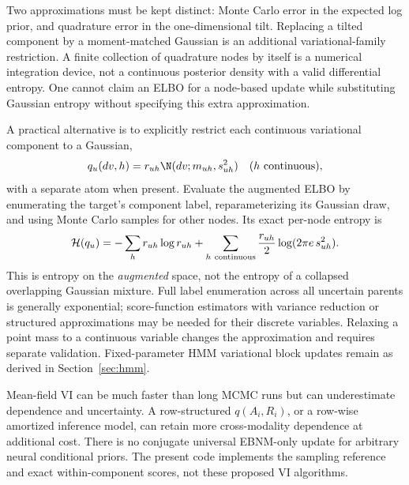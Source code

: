 Two approximations must be kept distinct: Monte Carlo error in the
expected log prior, and quadrature error in the one-dimensional tilt.
Replacing a tilted component by a moment-matched Gaussian is an
additional variational-family restriction. A finite collection of
quadrature nodes by itself is a numerical integration device, not a
continuous posterior density with a valid differential entropy.
One cannot claim an ELBO for a node-based update while substituting
Gaussian entropy without specifying this extra approximation.

A practical alternative is to explicitly restrict each continuous
variational component to a Gaussian,
\[
q_u(dv,h)=r_{uh}\N(dv;m_{uh},s_{uh}^2)
\quad(h\ {\rm continuous}),
\]
with a separate atom when present. Evaluate the augmented ELBO by
enumerating the target's component label, reparameterizing its Gaussian
draw, and using Monte Carlo samples for other nodes. Its exact per-node
entropy is
\[
\mathcal H(q_u)=-\sum_h r_{uh}\log r_{uh}
+\sum_{h\ {\rm continuous}}\frac{r_{uh}}2
       \log(2\pi e\,s_{uh}^2).
\]
This is entropy on the \emph{augmented} space, not the entropy of a
collapsed overlapping Gaussian mixture. Full label enumeration across
all uncertain parents is generally exponential; score-function
estimators with variance reduction or structured approximations may be
needed for their discrete variables. Relaxing a point mass to a
continuous variable changes the approximation and requires separate
validation. Fixed-parameter HMM variational block updates remain as
derived in Section~\ref{sec:hmm}.

Mean-field VI can be much faster than long MCMC runs but can underestimate
dependence and uncertainty. A row-structured \(q(A_i,R_i)\), or a
row-wise amortized inference model, can retain more cross-modality
dependence at additional cost. There is no conjugate universal
EBNM-only update for arbitrary neural conditional priors. The present
code implements the sampling reference and exact within-component
scores, not these proposed VI algorithms.

